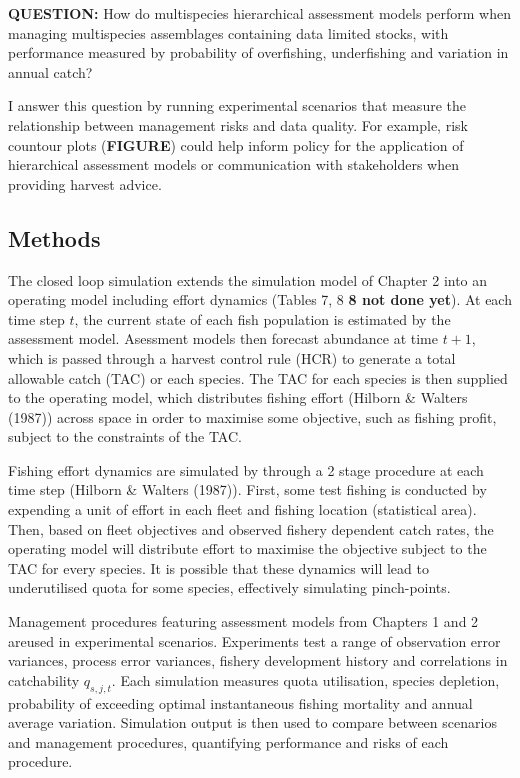 \documentclass[12pt,]{scrartcl}
\begin{document}
\textbf{QUESTION:} How do multispecies hierarchical assessment models
perform when managing multispecies assemblages containing data limited
stocks, with performance measured by probability of overfishing,
underfishing and variation in annual catch?

I answer this question by running experimental scenarios that measure
the relationship between management risks and data quality. For example,
risk countour plots (\textbf{FIGURE}) could help inform policy for the
application of hierarchical assessment models or communication with
stakeholders when providing harvest advice.

\subsection{Methods}\label{methods-2}

The closed loop simulation extends the simulation model of Chapter 2
into an operating model including effort dynamics (Tables 7, 8 \textbf{8
not done yet}). At each time step \(t\), the current state of each fish
population is estimated by the assessment model. Asessment models then
forecast abundance at time \(t+1\), which is passed through a harvest
control rule (HCR) to generate a total allowable catch (TAC) or each
species. The TAC for each species is then supplied to the operating
model, which distributes fishing effort (Hilborn \& Walters (1987))
across space in order to maximise some objective, such as fishing
profit, subject to the constraints of the TAC.

Fishing effort dynamics are simulated by through a 2 stage procedure at
each time step (Hilborn \& Walters (1987)). First, some test fishing is
conducted by expending a unit of effort in each fleet and fishing
location (statistical area). Then, based on fleet objectives and
observed fishery dependent catch rates, the operating model will
distribute effort to maximise the objective subject to the TAC for every
species. It is possible that these dynamics will lead to underutilised
quota for some species, effectively simulating pinch-points.

Management procedures featuring assessment models from Chapters 1 and 2
areused in experimental scenarios. Experiments test a range of
observation error variances, process error variances, fishery
development history and correlations in catchability \(q_{s,j,t}\). Each
simulation measures quota utilisation, species depletion, probability of
exceeding optimal instantaneous fishing mortality and annual average
variation. Simulation output is then used to compare between scenarios
and management procedures, quantifying performance and risks of each
procedure.
\end{document}
